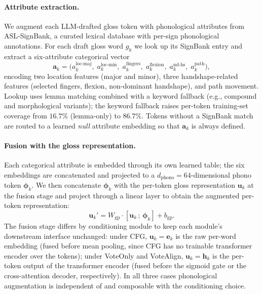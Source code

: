\documentclass{article}
\begin{document}
\paragraph{Attribute extraction.}
We augment each LLM-drafted gloss token with phonological attributes from ASL-SignBank, a curated lexical database with per-sign phonological annotations. For each draft gloss word $g_k$ we look up its SignBank entry and extract a six-attribute categorical vector
\[
\mathbf{a}_k = \big(a_k^{\text{loc-maj}},\; a_k^{\text{loc-min}},\; a_k^{\text{fingers}},\; a_k^{\text{flexion}},\; a_k^{\text{nd-hs}},\; a_k^{\text{path}}\big),
\]
encoding two location features (major and minor), three handshape-related features (selected fingers, flexion, non-dominant handshape), and path movement. Lookup uses lemma matching combined with a keyword fallback (e.g., compound and morphological variants); the keyword fallback raises per-token training-set coverage from $16.7\%$ (lemma-only) to $86.7\%$. Tokens without a SignBank match are routed to a learned \emph{null} attribute embedding so that $\mathbf{a}_k$ is always defined.

\paragraph{Fusion with the gloss representation.}
Each categorical attribute is embedded through its own learned table; the six embeddings are concatenated and projected to a $d_{\text{phono}}{=}64$-dimensional phono token $\boldsymbol{\phi}_k$. We then concatenate $\boldsymbol{\phi}_k$ with the per-token gloss representation $\mathbf{u}_k$ at the fusion stage and project through a linear layer to obtain the augmented per-token representation:
\begin{equation}
    \mathbf{u}_k' = W_{\text{gp}} \cdot [\mathbf{u}_k \,;\, \boldsymbol{\phi}_k] + b_{\text{gp}}.
\end{equation}
The fusion stage differs by conditioning module to keep each module's downstream interface unchanged: under CFG, $\mathbf{u}_k = \mathbf{e}_k$ is the raw per-word embedding (fused before mean pooling, since CFG has no trainable transformer encoder over the tokens); under VoteOnly and VoteAlign, $\mathbf{u}_k = \mathbf{h}_k$ is the per-token output of the transformer encoder (fused before the sigmoid gate or the cross-attention decoder, respectively). In all three cases phonological augmentation is independent of and composable with the conditioning choice.
\end{document}
